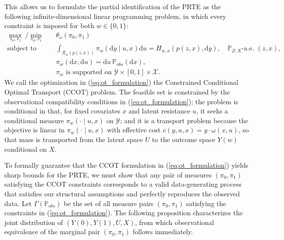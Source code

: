 This allows us to formulate the partial identification of the PRTE as the following infinite-dimensional linear programming problem, in which every constraint is imposed for both $w \in \{0,1\}$:
\begin{equation}\label{eq:ot_formulation}
    \begin{split}
        \max_{\pi_0, \pi_1} \ / \min_{\pi_0, \pi_1}\quad & \theta_\omega(\pi_0, \pi_1)\\
        \text{subject to}  \quad &  \int_{\mathcal{R}_w(p(z,x))} \pi_w(\mathrm{d}y \mid u, x) \mathrm{d}u = H_{w,x}(p(z,x),\mathrm{d}y), \quad \mathbb P_{Z,X}\text{-a.e. }(z,x),\\
        & \pi_w(\mathrm{d}x, \mathrm{d}u) = \mathrm{d}u \ \mathbb{P}_{obs}(\mathrm{d}x),\\
        & \pi_w \text{ is supported on } \mathcal{Y} \times [0,1] \times \mathcal{X}.
    \end{split}
\end{equation}
We call the optimization in (\ref{eq:ot_formulation}) the Constrained Conditional Optimal Transport (CCOT) problem. The feasible set is constrained by the observational compatibility conditions in (\ref{eq:ot_formulation}); the problem is conditional in that, for fixed covariates $x$ and latent resistance $u$, it seeks a conditional measure $\pi_w(\cdot \mid u, x)$ on $\mathcal{Y}$; and it is a transport problem because the objective is linear in $\pi_w(\cdot \mid u, x)$ with effective cost $c(y, u, x) = y \cdot \omega(x, u)$, so that mass is transported from the latent space $U$ to the outcome space $Y(w)$ conditional on $X$.

To formally guarantee that the CCOT formulation in (\ref{eq:ot_formulation}) yields sharp bounds for the PRTE, we must show that any pair of measures $(\pi_0, \pi_1)$ satisfying the CCOT constraints corresponds to a valid data-generating process that satisfies our structural assumptions and perfectly reproduces the observed data. Let $\Gamma(\mathbb{P}_{obs})$ be the set of all measure pairs $(\pi_0, \pi_1)$ satisfying the constraints in (\ref{eq:ot_formulation}). The following proposition characterizes the joint distribution of $(Y(0), Y(1), U, X)$, from which observational
equivalence of the marginal pair $(\pi_0, \pi_1)$ follows immediately.

